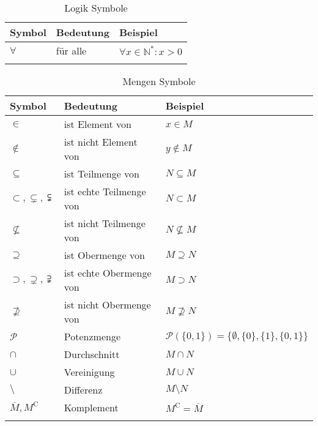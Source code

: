 \documentclass[../main.tex]{subfiles}
\begin{document}
	
	\newcommand{\newNotationRow}{\\[2.5mm]}
	
	\begin{longtable}{p{30mm}p{60mm}p{65mm}} %
		\toprule 
		
		\centering Symbol & Bedeutung & Beispiel \newNotationRow
		
		\midrule
				
		\centering $\forall$ & für alle & $\forall x \in \mathbb{N}^*: x > 0$ \newNotationRow
		
		\bottomrule
		
		\caption{Logik Symbole}
	\end{longtable}

		\begin{longtable}{p{30mm}p{60mm}p{65mm}} %
		\toprule 
		
		\centering Symbol & Bedeutung & Beispiel \newNotationRow
		
		\midrule
		
		\centering $\in$ & ist Element von & $x \in M$ \newNotationRow
		
		\centering $\not\in$ & ist nicht Element von & $y \not\in M$ \newNotationRow
		
		\centering $\subseteq$ & ist Teilmenge von & $N \subseteq M$ \newNotationRow
		
		\centering $\subset, \subsetneq, \subsetneqq$ & ist echte Teilmenge von & $N \subset M$ \newNotationRow
		
		\centering $\not\subseteq$ & ist nicht Teilmenge von & $N \not\subseteq M$ \newNotationRow
		
		\centering $\supseteq$ & ist Obermenge von & $M \supseteq N$ \newNotationRow
		
		\centering $\supset, \supsetneq, \supsetneqq$ & ist echte Obermenge von & $M \supset N$ \newNotationRow
		
		\centering $\not\supseteq$ & ist nicht Obermenge von & $M \not\supseteq N$ \newNotationRow
		
		\centering $\mathcal{P}$ & Potenzmenge & $\mathcal{P}(\{0,1\}) = \{\emptyset, \{0\}, \{1\}, \{0,1\}\}$ \newNotationRow
		
		\centering $\cap$ & Durchschnitt & $M \cap N$ \newNotationRow
		
		\centering $\cup$ & Vereinigung & $M \cup N$ \newNotationRow
		
		\centering $\setminus$ & Differenz & $M \setminus N$ \newNotationRow
		
		\centering $\overline{M}, M^\mathrm{C}$ & Komplement & $M^\mathrm{C} = \overline{M}$ \newNotationRow
				
		\bottomrule
		
		\caption{Mengen Symbole}
	\end{longtable}
\end{document}
